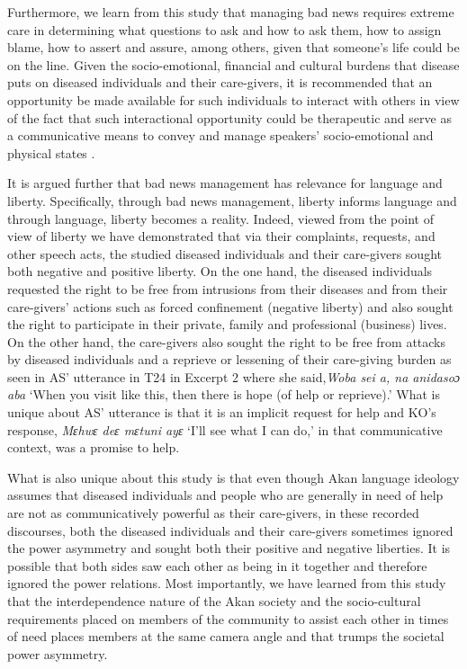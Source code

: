 \documentclass[output=paper,colorlinks,citecolor=brown]{langscibook}
\begin{document}
Furthermore, we learn from this study that managing bad news requires extreme care in determining what questions to ask and how to ask them, how to assign blame, how to assert and assure, among others, given that someone’s life could be on the line. Given the socio-emotional, financial and cultural burdens that disease puts on diseased individuals and their care-givers, it is recommended that an opportunity be made available for such individuals to interact with others in view of the fact that such interactional opportunity could be therapeutic and serve as a communicative means to convey and manage speakers’ socio-emotional and physical states \citep{KalmykovaMergenthaler1998}.

It is argued further that bad news management has relevance for language and liberty. Specifically, through bad news management, liberty informs language and through language, liberty becomes a reality. Indeed, viewed from the point of view of liberty \citep{Berlin1960} we have demonstrated that via their complaints, requests, and other speech acts, the studied diseased individuals and their care-givers sought both negative and positive liberty. On the one hand, the diseased individuals requested the right to be free from intrusions from their diseases and from their care-givers’ actions such as forced confinement (negative liberty) and also sought the right to participate in their private, family and professional (business) lives. On the other hand, the care-givers also sought the right to be free from attacks by diseased individuals and a reprieve or lessening of their care-giving burden as seen in AS’ utterance in T24 in Excerpt 2 where she said,\textit{Woba sei a, na anidasoɔ aba} ‘When you visit like this, then there is hope (of help or reprieve).’ What is unique about AS’ utterance is that it is an implicit request for help and KO’s response, \textit{Mɛhwɛ deɛ mɛtuni ayɛ }‘I’ll see what I can do,’ in that communicative context, was a promise to help. 

What is also unique about this study is that even though Akan language ideology assumes that diseased individuals and people who are generally in need of help are not as communicatively powerful as their care-givers, in these recorded discourses, both the diseased individuals and their care-givers sometimes ignored the power asymmetry and sought both their positive and negative liberties. It is possible that both sides saw each other as being in it together and therefore ignored the power relations. Most importantly, we have learned from this study that the interdependence nature of the Akan society and the socio-cultural requirements placed on members of the community to assist each other in times of need places members at the same camera angle and that trumps the societal power asymmetry. 
\end{document}

